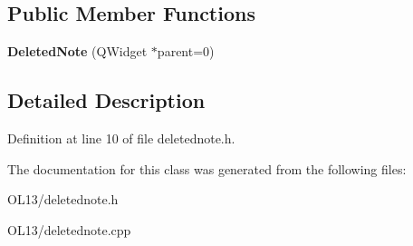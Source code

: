 \subsection*{Public Member Functions}
\begin{DoxyCompactItemize}
\item 
\mbox{\label{class_deleted_note_a23fe178b1e3f593b9ac1957e44271e7e}} 
{\bfseries Deleted\+Note} (Q\+Widget $\ast$parent=0)
\end{DoxyCompactItemize}


\subsection{Detailed Description}


Definition at line 10 of file deletednote.\+h.



The documentation for this class was generated from the following files\+:\begin{DoxyCompactItemize}
\item 
O\+L13/deletednote.\+h\item 
O\+L13/deletednote.\+cpp\end{DoxyCompactItemize}
